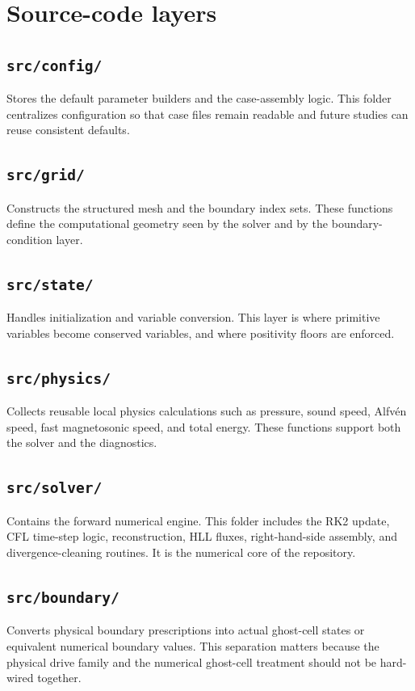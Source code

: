 \documentclass[11pt]{article}
\begin{document}
\section{Source-code layers}
\subsection{\texttt{src/config/}}
Stores the default parameter builders and the case-assembly logic. This folder centralizes configuration so that case files remain readable and future studies can reuse consistent defaults.

\subsection{\texttt{src/grid/}}
Constructs the structured mesh and the boundary index sets. These functions define the computational geometry seen by the solver and by the boundary-condition layer.

\subsection{\texttt{src/state/}}
Handles initialization and variable conversion. This layer is where primitive variables become conserved variables, and where positivity floors are enforced.

\subsection{\texttt{src/physics/}}
Collects reusable local physics calculations such as pressure, sound speed, Alfv\'en speed, fast magnetosonic speed, and total energy. These functions support both the solver and the diagnostics.

\subsection{\texttt{src/solver/}}
Contains the forward numerical engine. This folder includes the RK2 update, CFL time-step logic, reconstruction, HLL fluxes, right-hand-side assembly, and divergence-cleaning routines. It is the numerical core of the repository.

\subsection{\texttt{src/boundary/}}
Converts physical boundary prescriptions into actual ghost-cell states or equivalent numerical boundary values. This separation matters because the physical drive family and the numerical ghost-cell treatment should not be hard-wired together.
\end{document}
